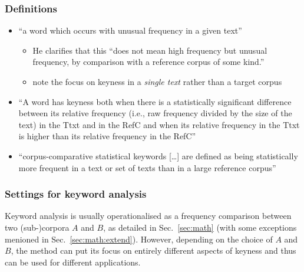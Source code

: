 \documentclass[a4paper]{article}
\begin{document}
\subsubsection{Definitions}
\label{sec:key:def}
\begin{itemize}
\item ``a word which occurs with unusual frequency in a given text'' \citep[236]{Scott:97}
  \begin{itemize}[nosep]
  \item He clarifies that this ``does not mean high frequency but unusual frequency, by comparison with a reference corpus of some kind.''
  \item note the focus on keyness in a \emph{single text} rather than a target corpus
  \end{itemize}
\item ``A word has keyness both when there is a statistically significant difference between its relative frequency (i.e., raw frequency divided by the size of the text) in the Ttxt and in the RefC and when its relative frequency in the Ttxt is higher than its relative frequency in the RefC'' \citep[203]{Fidler:15}
\item \citet[25]{OHalloran:11} ``corpus-comparative statistical keywords [\dots] are defined as being statistically more frequent in a text or set of texts than in a large reference corpus''
\end{itemize}

\subsubsection{Settings for keyword analysis}
\label{sec:key:settings}

Keyword analysis is usually operationalised as a frequency comparison between two (sub-)corpora $A$ and $B$, as detailed in Sec.~\ref{sec:math} (with some exceptions menioned in Sec.~\ref{sec:math:extend}).  However, depending on the choice of $A$ and $B$, the method can put its focus on entirely different aspects of keyness and thus can be used for different applications.
\end{document}
